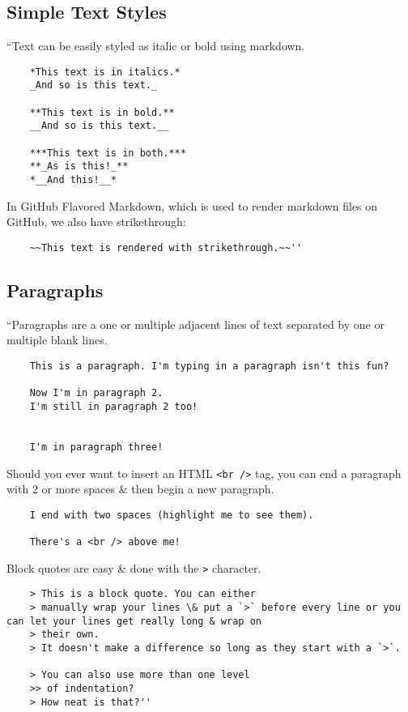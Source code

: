 \documentclass[oneside]{book}
\numberwithin{equation}{section}
\begin{document}
\subsection{Simple Text Styles}
``Text can be easily styled as italic or bold using markdown.
\begin{verbatim}
	*This text is in italics.*
	_And so is this text._
	
	**This text is in bold.**
	__And so is this text.__
	
	***This text is in both.***
	**_As is this!_**
	*__And this!__*
\end{verbatim}
In GitHub Flavored Markdown, which is used to render markdown files on GitHub, we also have strikethrough:
\begin{verbatim}
	~~This text is rendered with strikethrough.~~''
\end{verbatim}

\subsection{Paragraphs}
``Paragraphs are a one or multiple adjacent lines of text separated by one or multiple blank lines.
\begin{verbatim}
	This is a paragraph. I'm typing in a paragraph isn't this fun?
	
	Now I'm in paragraph 2.
	I'm still in paragraph 2 too!
	
	
	I'm in paragraph three!
\end{verbatim}
Should you ever want to insert an HTML \verb|<br />| tag, you can end a paragraph with 2 or more spaces \& then begin a new paragraph.
\begin{verbatim}
	I end with two spaces (highlight me to see them).
	
	There's a <br /> above me!
\end{verbatim}
Block quotes are easy \& done with the \texttt{>} character.
\begin{verbatim}
	> This is a block quote. You can either
	> manually wrap your lines \& put a `>` before every line or you can let your lines get really long & wrap on
	> their own.
	> It doesn't make a difference so long as they start with a `>`.
	
	> You can also use more than one level
	>> of indentation?
	> How neat is that?''
\end{verbatim}
\end{document}
